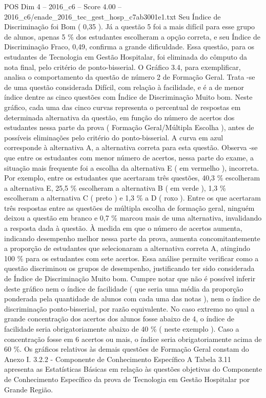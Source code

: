 \begin{textsample}{POS Dim 4 – 2016\_c6 – Score 4.00 – 2016\_c6/enade\_2016\_tec\_gest\_hosp\_c7ab3001e1.txt}
Seu Índice de Discriminação foi Bom ( 0,35 ).
Já a questão 5 foi a mais difícil para esse grupo de alunos, apenas 5 \% dos estudantes escolheram a opção correta, e seu Índice de Discriminação Fraco, 0,49, confirma a grande dificuldade.
Essa questão, para os estudantes de Tecnologia em Gestão Hospitalar, foi eliminada do cômputo da nota final, pelo critério de ponto-bisserial.
O Gráfico 3.4, para exemplificar, analisa o comportamento da questão de número 2 de Formação Geral.
Trata -se de uma questão considerada Difícil, com relação à facilidade, e é a de menor índice dentre as cinco questões com Índice de Discriminação Muito bom.
Neste gráfico, cada uma das cinco curvas representa o percentual de respostas em determinada alternativa da questão, em função do número de acertos dos estudantes nessa parte da prova ( Formação Geral/Múltipla Escolha ), antes de possíveis eliminações pelo critério do ponto-bisserial.
A curva em azul corresponde à alternativa A, a alternativa correta para esta questão.
Observa -se que entre os estudantes com menor número de acertos, nessa parte do exame, a situação mais frequente foi a escolha da alternativa E ( em vermelho ), incorreta.
Por exemplo, entre os estudantes que acertaram três questões, 40,3 \% escolheram a alternativa E, 25,5 \% escolheram a alternativa B ( em verde ), 1,3 \% escolheram a alternativa C ( preto ) e 1,3 \% a D ( roxo ).
Entre os que acertaram três respostas entre as questões de múltipla escolha de formação geral, ninguém deixou a questão em branco e 0,7 \% marcou mais de uma alternativa, invalidando a resposta dada à questão.
À medida em que o número de acertos aumenta, indicando desempenho melhor nessa parte da prova, aumenta concomitantemente a proporção de estudantes que selecionaram a alternativa correta A, atingindo 100 \% para os estudantes com sete acertos.
Essa análise permite verificar como a questão discriminou os grupos de desempenho, justificando ter sido considerada de Índice de Discriminação Muito bom.
Cumpre notar que não é possível inferir deste gráfico nem o índice de facilidade ( que seria uma média da proporção ponderada pela quantidade de alunos com cada uma das notas ), nem o índice de discriminação ponto-bisserial, por razão equivalente.
No caso extremo no qual a grande concentração dos acertos dos alunos fosse abaixo de 4, o índice de facilidade seria obrigatoriamente abaixo de 40 \% ( neste exemplo ).
Caso a concentração fosse em 6 acertos ou mais, o índice seria obrigatoriamente acima de 60 \%.
Os gráficos relativos às demais questões de Formação Geral constam do Anexo I. 3.2.2 - Componente de Conhecimento Específico A Tabela 3.11 apresenta as Estatísticas Básicas em relação às questões objetivas do Componente de Conhecimento Específico da prova de Tecnologia em Gestão Hospitalar por Grande Região.

\end{textsample}
